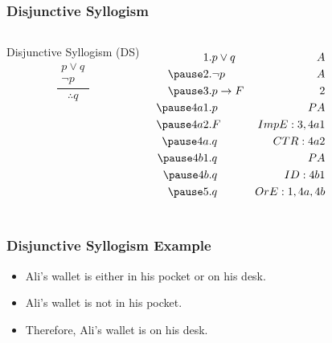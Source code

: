 \documentclass[dvipsnames]{beamer}
\begin{document}
\begin{frame}
  \frametitle{Disjunctive Syllogism}

  \begin{columns}
    \begin{block}{Disjunctive Syllogism (DS)}
      \[
      \frac
        {
          \begin{array}{c}
            p \vee q\\
            \neg p
          \end{array}
        }
        {
          \therefore q
        }
      \]
    \end{block}

    \pause
    \begin{eqnarray*}
      1.   & p \vee q        & A\\
      \pause
      2.   & \neg p          & A\\
      \pause
      3.   & p \rightarrow F & 2\\
      \pause
      4a1. & p               & PA\\
      \pause
      4a2. & F               & ImpE:3,4a1\\
      \pause
      4a.  & q               & CTR:4a2\\
      \pause
      4b1. & q               & PA\\
      \pause
      4b.  & q               & ID:4b1\\
      \pause
      5.   & q               & OrE:1,4a,4b
    \end{eqnarray*}
  \end{columns}
\end{frame}

\begin{frame}
  \frametitle{Disjunctive Syllogism Example}

  \begin{example}
    \begin{itemize}
      \item Ali's wallet is either in his pocket or on his desk.
      \item Ali's wallet is not in his pocket.

      \pause
      \medskip
      \item Therefore, Ali's wallet is on his desk.
    \end{itemize}
  \end{example}
\end{frame}
\end{document}
